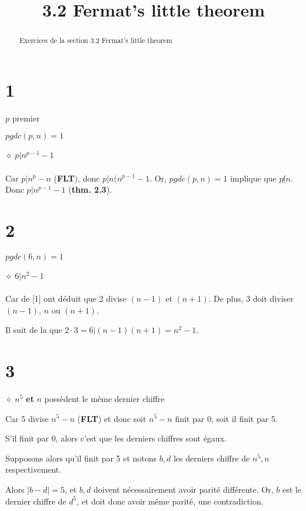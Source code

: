 \documentclass[a4paper,10pt]{article}
\title{3.2 Fermat's little theorem}
\begin{document}
\maketitle

\begin{abstract}
Exercices de la section 3.2 Fermat's little theorem
\end{abstract}

\section*{1}

\begin{enumerate}[leftmargin=*,label={[\arabic*]}]
 \item $p$ premier
 \item $pgdc(p,n) = 1$
\end{enumerate}
$\diamond$ $p | n^{p-1}-1$
\\
\\
Car $p | n^p-n$ (\textbf{FLT}), donc $p | n(n^{p-1}-1$. Or, $pgdc(p,n)=1$ implique que $p \not | n$. 
Donc $p | n^{p-1}-1$ (\textbf{thm. 2.3}).

\section*{2}

\begin{enumerate}[leftmargin=*,label={[\arabic*]}]
 \item $pgdc(6,n)=1$
\end{enumerate}
$\diamond$ $6 | n^2 - 1$
\\
\\
Car de [1] ont déduit que 2 divise $(n-1)$ et $(n+1)$. De plus, 3 doit diviser $(n-1)$, $n$ ou $(n+1)$. 

Il suit de la que $2 \cdot 3 = 6 | (n-1)(n+1) = n^2 - 1$.

\section*{3}

$\diamond$ $n^5$ \textbf{ et } $n$ possèdent le même dernier chiffre

Car 5 divise $n^5 - n$ (\textbf{FLT}) et donc soit $n^5 - n$ finit par 0, soit il finit par 5. 

S'il finit par 0, alors c'est que les derniers chiffres sont égaux. 

Supposons alors qu'il finit par 5 et notons $b,d$ les derniers chiffre de $n^5,n$ respectivement.

Alors $|b-d| = 5$, et $b,d$ doivent nécessairement avoir parité différente. Or, $b$ est le dernier chiffre
de $d^5$, et doit donc avoir même parité, une contradiction. 
\end{document}
